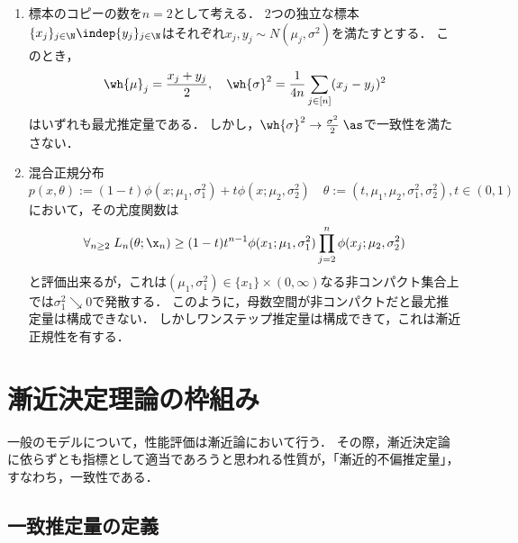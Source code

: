 \documentclass[uplatex,dvipdfmx]{jsreport}
\begin{document}
\begin{example}\mbox{}
    \begin{enumerate}
        \item 標本のコピーの数を$n=2$として考える．
        2つの独立な標本$\{x_j\}_{j\in\N}\indep\{y_j\}_{j\in\N}$はそれぞれ$x_j,y_j\sim N(\mu_j,\sigma^2)$を満たすとする．
        このとき，
        \[\wh{\mu}_j=\frac{x_j+y_j}{2},\quad\wh{\sigma}^2=\frac{1}{4n}\sum_{j\in[n]}(x_j-y_j)^2\]
        はいずれも最尤推定量である．
        しかし，$\wh{\sigma}^2\to\frac{\sigma^2}{2}\;\as$で一致性を満たさない．
        \item 混合正規分布
        \[p(x,\theta):=(1-t)\phi(x;\mu_1,\sigma_1^2)+t\phi(x;\mu_2,\sigma_2^2)\quad\theta:=(t,\mu_1,\mu_2,\sigma_1^2,\sigma_2^2),t\in(0,1)\]
        において，その尤度関数は
        \[\forall_{n\ge2}\;L_n(\theta;\x_n)\ge (1-t)t^{n-1}\phi(x_1;\mu_1,\sigma_1^2)\prod_{j=2}^n\phi(x_j;\mu_2,\sigma^2_2)\]
        と評価出来るが，これは$(\mu_1,\sigma_1^2)\in\{x_1\}\times(0,\infty)$なる非コンパクト集合上では$\sigma^2_1\searrow0$で発散する．
        このように，母数空間が非コンパクトだと最尤推定量は構成できない．
        しかしワンステップ推定量は構成できて，これは漸近正規性を有する．
    \end{enumerate}
\end{example}

\section{漸近決定理論の枠組み}

\begin{tcolorbox}[colframe=ForestGreen, colback=ForestGreen!10!white,breakable,colbacktitle=ForestGreen!40!white,coltitle=black,fonttitle=\bfseries\sffamily,
title=漸近的に不偏な推定量]
    一般のモデルについて，性能評価は漸近論において行う．
    その際，漸近決定論に依らずとも指標として適当であろうと思われる性質が，「漸近的不偏推定量」，すなわち，一致性である．
\end{tcolorbox}

\subsection{一致推定量の定義}
\end{document}
